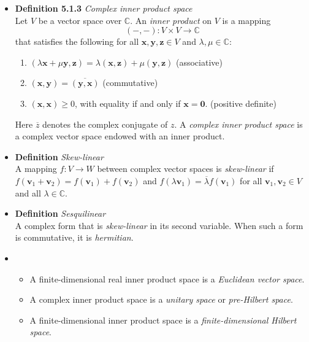 \documentclass[11pt,a4paper]{article}
\begin{document}
\begin{itemize}
    \item \textbf{Definition 5.1.3} \emph{Complex inner product space} \\
        Let $V$ be a vector space over $\mathbb{C}$.
        An \emph{inner product} on $V$ is a mapping
        \[
            (-, -) : V \times V \to \mathbb{C}
        \]
        that satisfies the following for all $\mathbf{x}, \mathbf{y}, \mathbf{z} \in V$
        and $\lambda, \mu \in \mathbb{C}$:
        \begin{enumerate}
            \item $(\lambda \mathbf{x} + \mu \mathbf{y}, \mathbf{z}) =
                \lambda(\mathbf{x}, \mathbf{z}) + \mu(\mathbf{y}, \mathbf{z})$
                \quad (associative)
            \item $(\mathbf{x}, \mathbf{y}) = \overline{(\mathbf{y}, \mathbf{x})}$
                \quad (commutative)
            \item $(\mathbf{x}, \mathbf{x}) \geq 0$,
                with equality if and only if $\mathbf{x} = \mathbf{0}$.
                \quad (positive definite)
        \end{enumerate}
        Here $\overline{z}$ denotes the complex conjugate of $z$.
        A \emph{complex inner product space} is a complex vector space endowed with an inner
        product.

    \item \textbf{Definition} \emph{Skew-linear} \\
        A mapping $f : V \to W$ between complex vector spaces is \emph{skew-linear}
        if $f(\mathbf{v}_1 + \mathbf{v}_2) = f(\mathbf{v}_1) + f(\mathbf{v}_2)$
        and $f(\lambda \mathbf{v}_1) = \overline{\lambda} f(\mathbf{v}_1)$
        for all $\mathbf{v}_1, \mathbf{v}_2 \in V$ and all $\lambda \in \mathbb{C}$.

    \item \textbf{Definition} \emph{Sesquilinear} \\
        A complex form that is \emph{skew-linear} in its second variable.
        When such a form is commutative, it is \emph{hermitian}.

    \item {}
        \begin{itemize}
            \item A finite-dimensional real inner product space is a
                \emph{Euclidean vector space}.
            \item A complex inner product space is a \emph{unitary space}
                or \emph{pre-Hilbert space}.
            \item A finite-dimensional inner product space is a
                \emph{finite-dimensional Hilbert space}.
        \end{itemize}


\end{itemize}
\end{document}
